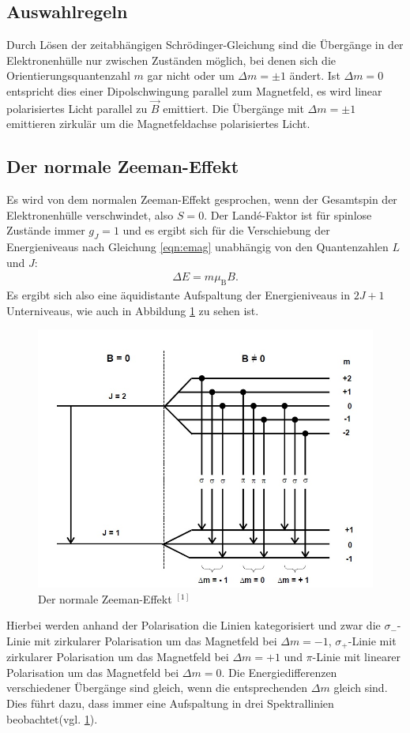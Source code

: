 \documentclass{article}
\begin{document}
	\subsection{Auswahlregeln}
	Durch Lösen der zeitabhängigen Schrödinger-Gleichung sind die Übergänge in der Elektronenhülle nur zwischen Zuständen möglich, bei denen sich die Orientierungsquantenzahl $m$ gar nicht oder um $\Delta m = \pm 1$ ändert. Ist $\Delta m = 0$ entspricht dies einer Dipolschwingung parallel zum Magnetfeld, es wird linear polarisiertes Licht parallel zu $\vec{B}$ emittiert. Die Übergänge mit $\Delta m = \pm 1$ emittieren zirkulär um die Magnetfeldachse polarisiertes Licht.
	
	\subsection{Der normale Zeeman-Effekt}
	Es wird von dem normalen Zeeman-Effekt gesprochen, wenn der Gesamtspin der Elektronenhülle verschwindet, also $S = 0$. Der Landé-Faktor ist für spinlose Zustände immer $g_J = 1$ und es ergibt sich für die Verschiebung der Energieniveaus nach Gleichung \ref{eqn:emag} unabhängig von den Quantenzahlen $L$ und $J$:
	\begin{align}
	\Delta E=m\mu_\text{B}B.
	\end{align}
	Es ergibt sich also eine äquidistante Aufspaltung der Energieniveaus in $2J+1$ Unterniveaus, wie auch in Abbildung \ref{fig:normalerzeemaneffekt} zu sehen ist.
	\begin{figure}[h!]
		\centering
		\includegraphics[width=0.7\linewidth]{NormalerZeemanEffekt.jpg}
		\caption{Der normale Zeeman-Effekt $^{[1]}$}
		\label{fig:normalerzeemaneffekt}
	\end{figure}
	Hierbei werden anhand der Polarisation die Linien kategorisiert und zwar die $\sigma_-$-Linie mit zirkularer Polarisation um das Magnetfeld bei $\Delta m = -1$, $\sigma_+$-Linie mit zirkularer Polarisation um das Magnetfeld bei $\Delta m = +1$ und $\pi$-Linie mit linearer Polarisation um das Magnetfeld bei $\Delta m = 0$. Die Energiedifferenzen verschiedener Übergänge sind gleich, wenn die entsprechenden $\Delta m$ gleich sind. Dies führt dazu, dass immer eine Aufspaltung in drei Spektrallinien beobachtet(vgl. \ref{fig:normalerzeemaneffekt}).
\end{document}

